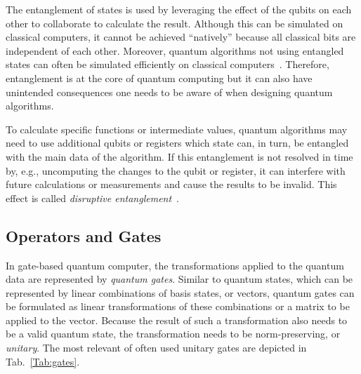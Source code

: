 The entanglement of states is used by leveraging the effect of the qubits on each other to collaborate to calculate the result. Although this can be simulated on classical computers, it cannot be achieved ``natively'' because all classical bits are independent of each other. Moreover, quantum algorithms not using entangled states can often be simulated efficiently on classical computers~\cite{MHH19}. Therefore, entanglement is at the core of quantum computing but it can also have unintended consequences one needs to be aware of when designing quantum algorithms.

To calculate specific functions or intermediate values, quantum algorithms may need to use additional qubits or registers which state can, in turn, be entangled with the main data of the algorithm. If this entanglement is not resolved in time by, e.g., uncomputing the changes to the qubit or register, it can interfere with future calculations or measurements and cause the results to be invalid. This effect is called \emph{disruptive entanglement}~\cite{YVC24}.  

\subsection{Operators and Gates}
In gate-based quantum computer, the transformations applied to the quantum data are represented by \emph{quantum gates}. Similar to quantum states, which can be represented by linear combinations of basis states, or vectors, quantum gates can be formulated as linear transformations of these combinations or a matrix to be applied to the vector. Because the result of such a transformation also needs to be a valid quantum state, the transformation needs to be norm-preserving, or \emph{unitary}. The most relevant of often used unitary gates are depicted in Tab.~\ref{Tab:gates}.

